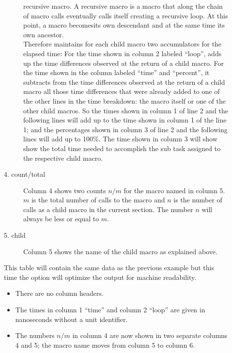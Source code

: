 \documentclass[a4paper,english]{article}
\begin{document}
\begin{description}
\begin{description}
      recursive macro. A recursive macro is a macro that along the
      chain of macro calls eventually calls itself creating a
      recursive loop. At this point, a macro becomesits own descendant
      and at the same time its own ancestor.
      \\
      Therefore  maintains for each child macro two
      accumulators for the elapsed time: For the time shown in 
      column 2 labeled ``loop'',  adds up the time
      differences observed at the return of a child macro.  For the
      time shown in the column labeled ``time'' and ``percent'', it
      subtracts from the time differences observed at the return of a
      child macro all those time differences that were already added
      to one of the other lines in the time breakdown: the macro itself
      or one of the other child macros.
      So the times shown in column 1 of line 2 and the following lines
      will add up to the time shown in column 1 of the line 1;
      and the percentages shown in column 3 of line 2 and the following lines
      will add up to 100\%.
      The time shown in column 3 will show show the total time needed
      to accomplish the sub task assigned to the respective child macro.
    \item[4. count/total]
      Column 4 shows two counts $n/m$ for the macro named in column 5.
      $m$ is the total number of calls to the macro and $n$ is the number of
      calls as a child macro in the current section. The number $n$ will
      always be less or equal to $m$.

    \item[5. child]
      Column 5 shows the name of the child macro as explained above.
  \end{description}
\item[\Prog{texprofile} \Opt{-G} \Opt{-m} \Arg{hello}]
  This table will contain the same data as the previous example
  but this time the  option will optimize the output for
  machine readability.
  \begin{itemize}
    \item There are no column headers.
    \item The times in column 1 ``time'' and column 2 ``loop''
      are given in nanoseconds without a unit identifier.
    \item The numbers $n/m$ in column 4 are now shown in two separate
      columns 4 and 5; the macro name moves from column 5 to column 6.
  \end{itemize}


\end{description}
\end{document}

